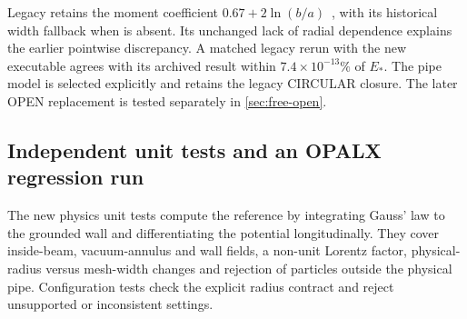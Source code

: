 Legacy  retains the moment coefficient
$0.67+2\ln(b/a)$~\cite{oeftiger}, with its historical width fallback when
 is absent. Its unchanged lack of radial dependence explains
the earlier pointwise discrepancy. A matched legacy rerun with the new
executable agrees with its archived result within $7.4\times10^{-13}\%$ of
$E_*$. The pipe model is selected explicitly and retains the legacy CIRCULAR
closure. The later OPEN replacement is tested separately in \cref{sec:free-open}.

\clearpage
\subsection{Independent unit tests and an OPALX regression run}
\label{sec:pipe-gates}
The new physics unit tests compute the reference by integrating Gauss' law
to the grounded wall and differentiating the potential longitudinally.
They cover inside-beam, vacuum-annulus and wall fields, a non-unit Lorentz
factor, physical-radius versus mesh-width changes and rejection of particles
outside the physical pipe. Configuration tests check the explicit radius
contract and reject unsupported or inconsistent settings.

